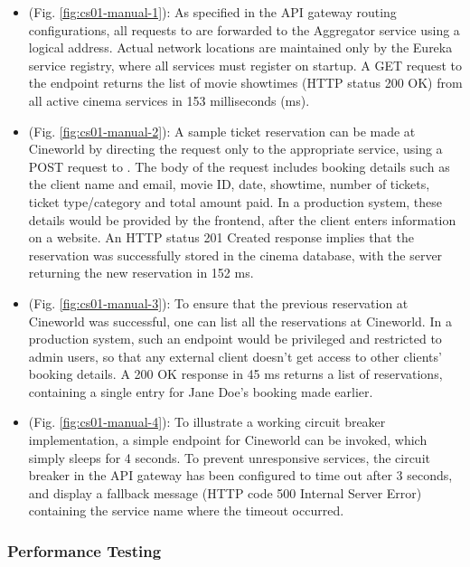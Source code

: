 \begin{itemize}
  \item {} (Fig. \ref{fig:cs01-manual-1}): As specified in the API gateway routing configurations, all requests to  are forwarded to the Aggregator service using a logical address. Actual network locations are maintained only by the Eureka service registry, where all services must register on startup. A GET request to the  endpoint returns the list of movie showtimes (HTTP status 200 OK) from all active cinema services in 153 milliseconds (ms).

  \item {} (Fig. \ref{fig:cs01-manual-2}): A sample ticket reservation can be made at Cineworld by directing the request only to the appropriate service, using a POST request to . The body of the request includes booking details such as the client name and email, movie ID, date, showtime, number of tickets, ticket type/category and total amount paid. In a production system, these details would be provided by the frontend, after the client enters information on a website. An HTTP status 201 Created response implies that the reservation was successfully stored in the cinema database, with the server returning the new reservation in 152 ms.

  \item {} (Fig. \ref{fig:cs01-manual-3}): To ensure that the previous reservation at Cineworld was successful, one can list all the reservations at Cineworld. In a production system, such an endpoint would be privileged and restricted to admin users, so that any external client doesn't get access to other clients' booking details. A 200 OK response in 45 ms returns a list of reservations, containing a single entry for Jane Doe's booking made earlier.

  \item {} (Fig. \ref{fig:cs01-manual-4}): To illustrate a working circuit breaker implementation, a simple  endpoint for Cineworld can be invoked, which simply sleeps for 4 seconds. To prevent unresponsive services, the circuit breaker in the API gateway has been configured to time out after 3 seconds, and display a fallback message (HTTP code 500 Internal Server Error) containing the service name where the timeout occurred.
\end{itemize}


\subsubsection{Performance Testing}

